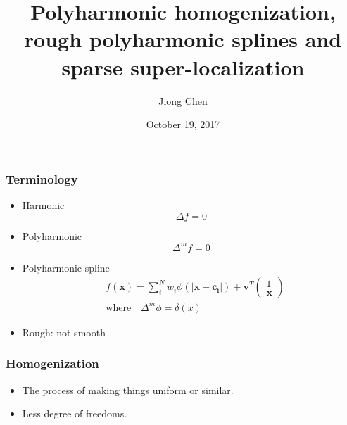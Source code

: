 \documentclass[serif,mathserif, 12pt]{beamer}
\author[Jiong Chen]{Jiong Chen}
\title[\hspace{2em}\insertframenumber/\inserttotalframenumber]{Polyharmonic homogenization, rough polyharmonic splines and sparse super-localization}
\date{October 19, 2017}
\newcommand{\BOLD}[1]{\mathbf{#1}}
\begin{document}
\maketitle

\begin{frame}
  \frametitle{Terminology}
  \begin{itemize}
  \item Harmonic
    \begin{equation*}
      \Delta f = 0
    \end{equation*}
  \item Polyharmonic
    \begin{equation*}
      \Delta^m f = 0
    \end{equation*}
  \item Polyharmonic spline
    \begin{equation*}
      \begin{split}
       & f(\BOLD{x}) = \sum_i^N w_i\phi(|\BOLD{x}-\BOLD{c_i}|)+\BOLD{v}^T
      \begin{pmatrix}
        1 \\ \BOLD{x} 
      \end{pmatrix} \\
      &\text{where}\quad \Delta ^m \phi = \delta(x)
      \end{split}
    \end{equation*}
    \item Rough: not smooth
  \end{itemize}
\end{frame}

\begin{frame}
  \frametitle{Homogenization}
  \begin{itemize}
  \item The process of making things uniform or similar.
  \item Less degree of freedoms.
  \end{itemize}
\end{frame}
\end{document}
